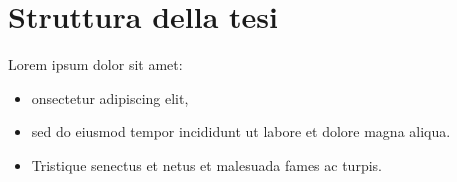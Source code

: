\section[Struttura della tesi]{Struttura della tesi}

Lorem ipsum dolor sit amet:
\begin{itemize}
    \item onsectetur adipiscing elit,
    \item sed do eiusmod tempor incididunt ut labore et dolore magna aliqua.
    \item Tristique senectus et netus et malesuada fames ac turpis.
\end{itemize}
